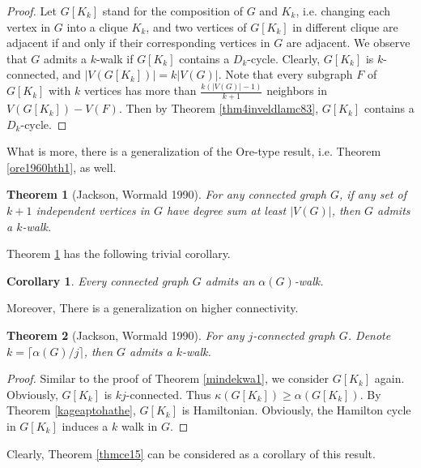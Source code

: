 \documentclass[12pt]{report}
\newtheorem{theorem}{Theorem}
\newtheorem{corollary}{Corollary}
\begin{document}
\begin{proof}
Let $G[K_k]$ stand for the composition of $G$ and $K_k$, i.e. changing each vertex in $G$ into a clique $K_k$, and two vertices of $G[K_k]$ in different clique are adjacent if and only if their corresponding vertices in $G$ are adjacent. We observe that $G$ admits a $k$-walk if $G[K_k]$ contains a $D_k$-cycle. Clearly, $G[K_k]$ is $k$-connected, and $|V(G[K_k])|=k|V(G)|$. Note that every subgraph $F$ of $G[K_k]$ with $k$ vertices has more than $\frac{k(|V(G)|-1)}{k+1}$ neighbors in $V(G[K_k])-V(F)$. Then by Theorem \ref{thm4inveldlamc83}, $G[K_k]$ contains a $D_k$-cycle.




\end{proof}


What is more, there is a generalization of the Ore-type result, i.e. Theorem \ref{ore1960hth1}, as well.

\begin{theorem}[Jackson, Wormald 1990]\label{oretjacw1}
For any connected graph $G$, if any set of $k+1$ independent vertices in $G$ have degree sum at least $|V(G)|$, then $G$ admits a $k$-walk.
\end{theorem}


Theorem \ref{oretjacw1} has the following trivial corollary.
\begin{corollary}\label{cooretjacw1}
Every connected graph $G$ admits an $\alpha(G)$-walk.
\end{corollary}


Moreover, There is a generalization on higher connectivity.

\begin{theorem}[Jackson, Wormald 1990]\label{alphkwjc1}
For any $j$-connected graph $G$. Denote $k=\lceil\alpha(G)/j\rceil$, then $G$ admits a $k$-walk.
\end{theorem}


\begin{proof}
Similar to the proof of Theorem \ref{mindekwa1}, we consider $G[K_k]$ again. Obviously, $G[K_k]$ is $kj$-connected. Thus $\kappa(G[K_k])\ge\alpha(G[K_k])$. By Theorem \ref{kageaptohathe}, $G[K_k]$ is Hamiltonian. Obviously, the Hamilton cycle in $G[K_k]$ induces a $k$ walk in $G$.
\end{proof}

Clearly, Theorem \ref{thmce15} can be considered as a corollary of this result.
\end{document}
